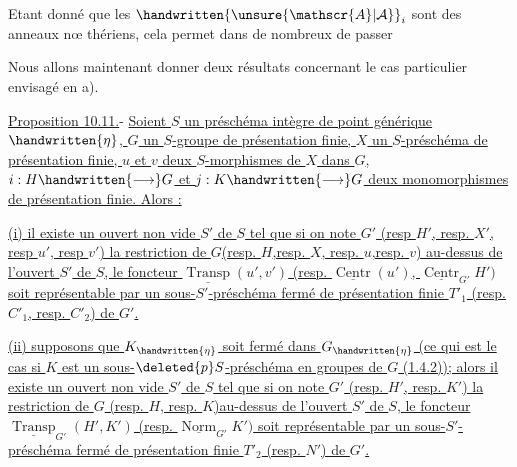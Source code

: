 
Etant donné que les $\handwritten{\unsure{\mathscr{A}|\mathcal{A}}}_i$ sont des anneaux  nœ thériens, cela permet dans de nombreux de passer

Nous allons maintenant donner deux résultats concernant le cas particulier envisagé en a).

\uline{Proposition 10.11.}- \uline{Soient $S$ un préschéma intègre de point générique $\handwritten{\eta}$, $G$ un $S$-groupe de présentation finie, $X$ un $S$-préschéma de présentation finie, $u$ et $v$ deux $S$-morphismes de $X$ dans $G$, $i:H\handwritten{\longrightarrow}G$ et $j:K\handwritten{\longrightarrow}G$ deux monomorphismes de présentation finie. Alors :}

\uline{(i) il existe un ouvert non vide $S'$ de $S$ tel que si on note $G'$ (resp $H'$, resp. $X'$, resp $u'$, resp $v'$) la restriction de $G$(resp. $H$,resp. $X$, resp. $u$,resp. $v$) au-dessus de l'ouvert $S'$ de $S$, le foncteur $\underline{\operatorname{Transp}}(u',v')$ (resp. $\underline{\operatorname{Centr}}(u')$, $\underline{\operatorname{Centr}}_{G'}H')$ soit représentable par un sous-$S'$-préschéma fermé de présentation finie $T'_1$ (resp. $C'_1$, resp. $C'_2$) de $G'$.}

\uline{(ii) supposons que $K_{\handwritten{\eta}}$ soit fermé dans $G_{\handwritten{\eta}}$ (ce qui est le cas si $K$ est un sous-$\deleted{p}S$-préschéma en groupes de $G$ (1.4.2)); alors il existe un ouvert non vide $S'$ de $S$ tel que si on note $G'$ (resp. $H'$, resp. $K'$) la restriction de $G$ (resp. $H$, resp. $K$)au-dessus de l'ouvert $S'$ de $S$, le foncteur $\underline{\operatorname{Transp}}_{G'}(H',K')$ (resp. $\underline{\operatorname{Norm}}_{G'}K')$ soit représentable par un sous-$S'$-préschéma fermé de présentation finie $T'_2$ (resp. $N'$) de $G'$.}

